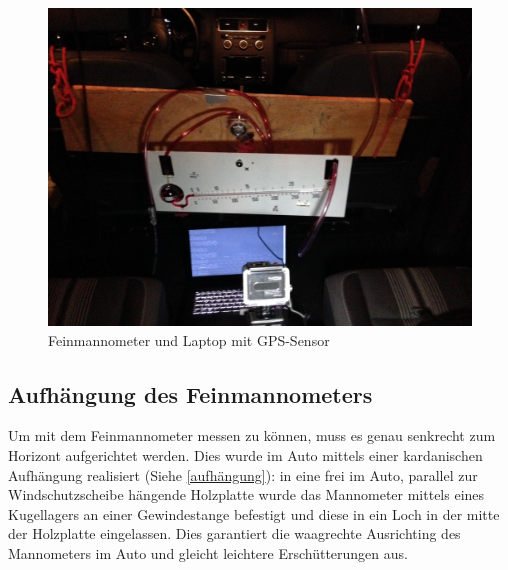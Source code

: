 \begin{figure}
\centering
	\includegraphics[width=\textwidth]{images/messung.jpg}
	\caption{Feinmannometer und Laptop mit GPS-Sensor}
	\label{messung}
\end{figure}

\subsection{Aufhängung des Feinmannometers}
Um mit dem Feinmannometer messen zu können, muss es genau senkrecht zum Horizont aufgerichtet werden. Dies wurde im Auto mittels einer kardanischen Aufhängung realisiert (Siehe \ref{aufhängung}): in eine frei im Auto, parallel zur Windschutzscheibe hängende Holzplatte wurde das Mannometer mittels eines Kugellagers an einer Gewindestange befestigt und diese in ein Loch in der mitte der Holzplatte eingelassen. Dies garantiert die waagrechte Ausrichting des Mannometers im Auto und gleicht leichtere Erschütterungen aus. 


